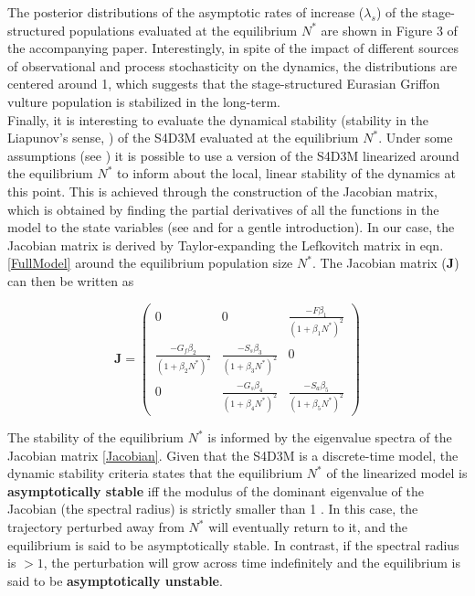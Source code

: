 \documentclass[12pt,a4paper]{article}
\begin{document}
The posterior distributions of the asymptotic rates of increase ($\lambda_{s}$) of the stage-structured populations evaluated at the equilibrium $N^*$ are shown in Figure 3 of the accompanying paper. Interestingly, in spite of the impact of different sources of observational and process stochasticity on the dynamics, the distributions are centered around 1, which suggests that the stage-structured Eurasian Griffon vulture population is stabilized in the long-term. \\

Finally, it is interesting to evaluate the dynamical stability (stability in the Liapunov's sense, \cite{Elaydi2005}) of the S4D3M evaluated at the equilibrium $N^*$. Under some assumptions (see \cite{Caswell2001,Elaydi2005}) it is possible to use a version of the S4D3M linearized around the equilibrium $N^*$ to inform about the local, linear stability of the dynamics at this point. This is achieved through the construction of the Jacobian matrix, which is obtained by finding the partial derivatives of all the functions in the model to the state variables (see \cite{Caswell2001} and \cite{Otto2011} for a gentle introduction). In our case, the Jacobian matrix is derived by Taylor-expanding the Lefkovitch matrix in eqn. \ref{FullModel} around the equilibrium population size $N^*$. The Jacobian matrix (\textbf{J}) can then be written as

\vspace{0.2in}

\begin{equation}\label{Jacobian}
	\mathbf{J} = \left(
	\begin{array}{ccc}
		{0} & {0} & {\frac{-F \beta_{1}}{(1 + \beta_{1} N^*)^2}} \\
		{\frac{-G_{f} \beta_{2}}{(1 + \beta_{2} N^*)^2}} & {\frac{-S_{s} \beta_{3}}{(1 + \beta_{3} N^*)^2}} & {0} \\
		{0} & {\frac{-G_{s} \beta_{4}}{(1 + \beta_{4} N^*)^2}} & {\frac{-S_{a} \beta_{5}}{(1 + \beta_{5} N^*)^2}}
	\end{array}\right)
\end{equation}

\vspace{0.2in}

The stability of the equilibrium $N^*$ is informed by the eigenvalue spectra of the Jacobian matrix \ref{Jacobian}. Given that the S4D3M is a discrete-time model, the dynamic stability criteria states that the equilibrium $N^*$ of the linearized model is \textbf{asymptotically stable} iff the modulus of the dominant eigenvalue of the Jacobian (the spectral radius) is strictly smaller than 1 \cite{Elaydi2005}. In this case, the trajectory perturbed away from $N^*$ will eventually return to it, and the equilibrium is said to be asymptotically stable. In contrast, if the spectral radius is $>1$, the perturbation will grow across time indefinitely and the equilibrium is said to be \textbf{asymptotically unstable}.\\
\end{document}
